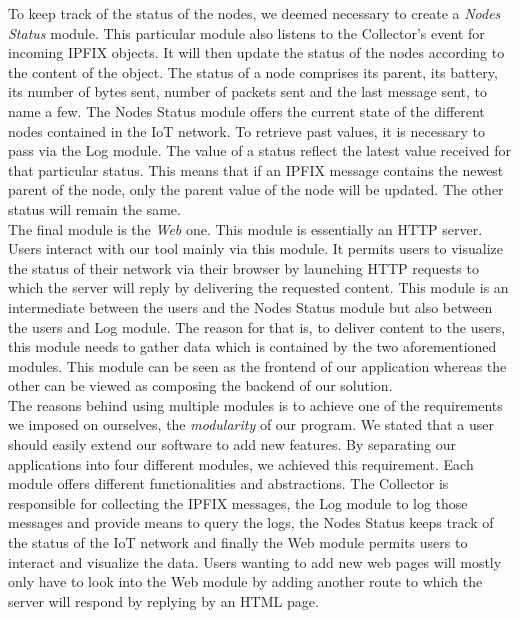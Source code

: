 To keep track of the status of the nodes, we deemed necessary to create a \textit{Nodes Status} module. This particular module also listens to the Collector's event for incoming IPFIX objects. It will then update the status of the nodes according to the content of the object. The status of a node comprises its parent, its battery, its number of bytes sent, number of packets sent and the last message sent, to name a few. The Nodes Status module offers the current state of the different nodes contained in the IoT network. To retrieve past values, it is necessary to pass via the Log module. The value of a status reflect the latest value received for that particular status. This means that if an IPFIX message contains the newest parent of the node, only the parent value of the node will be updated. The other status will remain the same.  \\

The final module is the \textit{Web} one. This module is essentially an HTTP server. Users interact with our tool mainly via this module. It permits users to visualize the status of their network via their browser by launching HTTP requests to which the server will reply by delivering the requested content. This module is an intermediate between the users and the Nodes Status module but also between the users and Log module. The reason for that is, to deliver content to the users, this module needs to gather data which is contained by the two aforementioned modules. This module can be seen as the frontend of our application whereas the other can be viewed as composing the backend of our solution.\\

The reasons behind using multiple modules is to achieve one of the requirements we imposed on ourselves, the \textit{modularity} of our program. We stated that a user should easily extend our software to add new features. By separating our applications into four different modules, we achieved this requirement. Each module offers different functionalities and abstractions. The Collector is responsible for collecting the IPFIX messages, the Log module to log those messages and provide means to query the logs, the Nodes Status keeps track of the status of the IoT network and finally the Web module permits users to interact and visualize the data. Users wanting to add new web pages will mostly only have to look into the Web module by adding another route to which the server will respond by replying by an HTML page. \\

